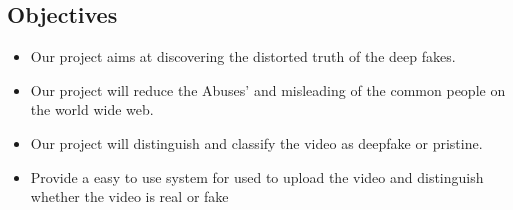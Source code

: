 \subsection{Objectives}
\justify
\begin{itemize}
    \item Our project aims at discovering the distorted truth of the deep fakes.
    \item Our project will reduce the Abuses’ and misleading of the common people on
          the world wide web.
    \item Our project will distinguish and classify the video as deepfake or pristine.
    \item Provide a easy to use system for used to upload the video and distinguish
          whether the video is real or fake
\end{itemize}
